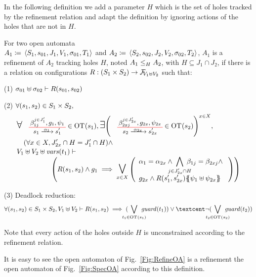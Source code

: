 \documentclass[runningheads]{llncs}
\begin{document}
In the following definition we add a parameter $H$ which is the set of holes tracked by the refinement relation and adapt the definition by ignoring actions of the holes that are not in $H$.
\begin{definition}\label{Def:OA-Refinement}
For two open automata\\ \(A_1 \defobject \OA{S_1}{s_{01}}{J_1}{V_1}{\sigma_{01}}{T_1}\) and \(A_2 \defobject \OA{S_2}{s_{02}}{J_2}{V_2}{\sigma_{02}}{T_2}\), \(A_1\) is a refinement of \(A_2\) tracking holes \(H\), noted \(\wrel{A_1}{A_2}{H}\), with \(H \subseteq J_1 \cap J_2\), if there is a relation on configurations $R: \mpar{S_1 \times S_2} \to \rformulas[V_1 \uplus V_2]$ such that:
\item[(1)] \(\sigma_{01} \uplus \sigma_{02} \vdash R\mpar{s_{01}, s_{02}}\)
\item[(2)] \(\forall \mpar{s_1, s_2} \in S_1 \times S_2,\)
\begin{multline*}
	\everymath{\displaystyle}\begin{array}{l}
		\bigsymb{\forall} \OTx{1}{}{1}{1} \in \fOT{s_1}, \bigsymb{\exists} \mpar{\OTx{2}{x}{2x}{2x} \in \fOT{s_2}}^{x \in X}, \\[12pt]
		\quad \mpar{\forall x \in X, J'_{2x} \cap H = J'_1 \cap H} \nwedge\\[1pt]
		 V_1 \uplus V_2 \uplus \fvars{t_1} \vdash\\\hspace{5em} \mpar{R\mpar{s_1, s_2} \wedge g_1 \implies \operatorname*{\bigsymb{\bigvee}}_{x \in X} \mpar{\begin{array}{l}
			\alpha_1 = \alpha_{2x} \wedge \bigwedge_\subbox{j \in J'_{2x} \cap H} \beta_{1j} = \beta_{2xj}   \nwedge\\
			 g_{2x} \wedge R\mpar{s'_1, s'_{2x}}\psubst{\psi_1 \uplus \psi_{2x}}
		\end{array}}} 
	\end{array} 
\end{multline*}
\item[(3)] Deadlock reduction:
\[
\forall \mpar{s_1, s_2} \in S_1 \times S_2, V_1 \uplus V_2  \vdash R\mpar{s_1, s_2} \implies( \bigvee_\subbox{t_1 \in \fOT{s_1}} \fguard{t_1} ) \lor¢ \lnot( \bigvee_\subbox{t_2 \in \fOT{s_2}} \fguard{t_2}  )
\]
\end{definition}
Note that every action of the holes outside \(H\) is unconstrained according to the refinement relation.

\begin{example} It is easy to see the  open automaton of Fig.~\ref{Fig:RefineOA} is a refinement the open automaton of Fig.~\ref{Fig:SpecOA} according to this definition.
\end{example}
\end{document}
